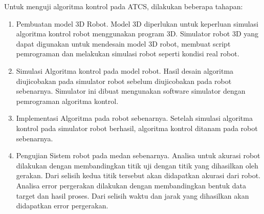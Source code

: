 Untuk menguji algoritma kontrol pada ATCS, dilakukan beberapa tahapan:

\begin{enumerate}
	\item Pembuatan model 3D Robot. Model 3D diperlukan untuk keperluan simulasi algoritma kontrol robot menggunakan program 3D. Simulator robot 3D yang dapat digunakan untuk mendesain model 3D robot, membuat script pemrograman dan melakukan simulasi robot seperti kondisi real robot.

\item Simulasi Algoritma kontrol pada model robot. Hasil desain algoritma diujicobakan pada simulator robot sebelum diujicobakan pada robot sebenarnya. Simulator ini dibuat mengunakan software simulator dengan pemrograman algoritma kontrol.

\item Implementasi Algoritma pada robot sebenarnya. Setelah simulasi algoritma kontrol pada simulator robot berhasil, algoritma kontrol ditanam pada robot sebenarnya.
\item Pengujian Sistem robot pada medan sebenarnya. Analisa untuk akurasi robot dilakukan dengan membandingkan titik uji dengan titik yang dihasilkan oleh gerakan. Dari selisih kedua titik tersebut akan didapatkan akurasi dari robot.  Analisa error pergerakan dilakukan dengan membandingkan bentuk data target dan hasil proses. Dari selisih waktu dan jarak yang dihasilkan akan didapatkan error pergerakan.
\end{enumerate}